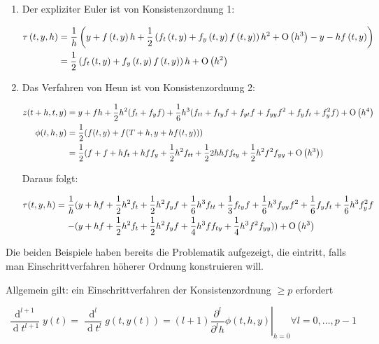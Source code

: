 \begin{example}
	\*
	\begin{enumerate}
		\item
			Der expliziter Euler ist von Konsistenzordnung 1:
			
			\begin{align*}
				\tau\left(t,y,h\right) &= \frac{1}{h} \left(y + f\left(t,y\right) h + \frac{1}{2} \left(f_t\left(t,y\right) + f_y\left(t,y\right) f\left(t,y\right)\right) h^2 + \operatorname{O}\left(h^3\right) - y - hf\left(t,y\right)\right) \\
				& = \frac{1}{2} \left(f_t\left(t,y\right) + f_y\left(t,y\right) f\left(t,y\right)\right) h + \operatorname{O}\left(h^2\right) 
			\end{align*}
			
		\item
			Das Verfahren von Heun ist von Konsistenzordnung 2:
			
			\begin{align*}
				z(t+h,t,y) &= y+f h + \frac{1}{2} h^2 (f_t + f_yf) + \frac{1}{6} h^3(f_{tt} + f_{ty}f + f_{yt} f + f_{yy}f^2 + f_yf_t + f_y^2 f) + \operatorname{O}\left(h^4\right) \\
				\phi(t,h,y) &= \frac{1}{2} ( f(t,y) + f(T+h, y+hf(t,y))) \\
				&= \frac{1}{2} (f + f + hf_t + h f f_y + \frac{1}{2} h^2 f_{tt} + \frac{1}{2} 2 h h f f_{ty} + \frac{1}{2} h^2 f^2 f_{yy} + \operatorname{O}\left(h^3\right))
			\end{align*}
			
			Daraus folgt:
			
			\begin{align*}
				\tau(t,y,h) = \frac{1}{h} &(y + hf + \frac{1}{2} h^2 f_t + \frac{1}{2} h^2 f_yf + \frac{1}{6} h^3 f_{tt} + \frac{1}{3} f_{ty}f + \frac{1}{6} h^3 f_{yy} f^2 + \frac{1}{6} f_yf_t + \frac{1}{6} h^3 f_y^2 f \\
				- &(y + hf + \frac{1}{2} h^2 f_t + \frac{1}{2} h^2 f_yf + \frac{1}{4} h^3 ff_{ty} + \frac{1}{4} h^3 f^2f_{yy})) + \operatorname{O}\left(h^3\right)
			\end{align*}
	\end{enumerate}
\end{example}

Die beiden Beispiele haben bereits die Problematik aufgezeigt, die eintritt, falls man Einschrittverfahren höherer Ordnung konstruieren will. 

Allgemein gilt: ein Einschrittverfahren der Konsistenzordnung $\ge p$ erfordert 

$$\frac{\operatorname{d}^{l+1}}{\operatorname{d}t^{l+1}} y(t) = \frac{\operatorname{d}^{l}}{\operatorname{d}t^{l}} g(t,y(t)) = \left. (l+1) \frac{\partial^l}{\partial^l h} \phi (t,h,y) \right|_{h = 0} \forall l=0, \dots, p-1$$ 

